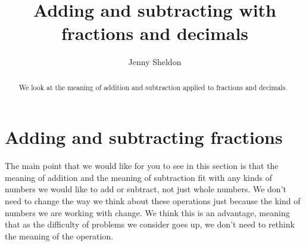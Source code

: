 \documentclass{ximera}
\title{Adding and subtracting with fractions and decimals}
\author{Jenny Sheldon}
\begin{document}
\begin{abstract}
We look at the meaning of addition and subtraction applied to fractions and decimals.
\end{abstract}
\maketitle





\section{Adding and subtracting fractions}

The main point that we would like for you to see in this section is that the meaning of addition and the meaning of subtraction fit with any kinds of numbers we would like to add or subtract, not just whole numbers. We don't need to change the way we think about these operations just because the kind of numbers we are working with change. We think this is an advantage, meaning that as the difficulty of problems we consider goes up, we don't need to rethink the meaning of the operation. 
\end{document}
